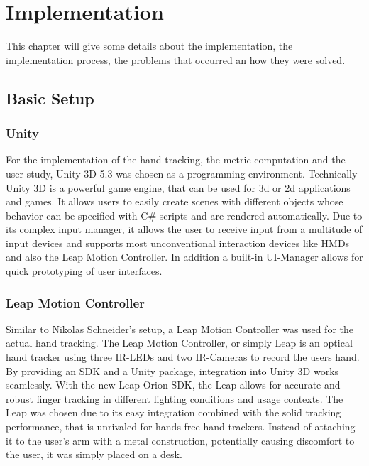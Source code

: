 \chapter{Implementation}\label{chapter:implementation}

This chapter will give some details about the implementation, the implementation process, the problems that occurred an how they were solved.

\section{Basic Setup}

\subsection{Unity}

For the implementation of the hand tracking, the metric computation and the user study, Unity 3D 5.3 was chosen as a programming environment. Technically Unity 3D is a powerful game engine, that can be used for 3d or 2d applications and games. It allows users to easily create scenes with different objects whose behavior can be specified with \textsc{C\#} scripts and are rendered automatically. Due to its complex input manager, it allows the user to receive input from a multitude of input devices and supports most unconventional interaction devices like HMDs and also the Leap Motion Controller. In addition a built-in UI-Manager allows for quick prototyping of user interfaces. 

\subsection{Leap Motion Controller}

Similar to Nikolas Schneider's setup, a Leap Motion Controller was used for the actual hand tracking. The Leap Motion Controller, or simply Leap is an optical hand tracker using three IR-LEDs and two IR-Cameras to record the users hand. By providing an SDK and a Unity package, integration into Unity 3D works seamlessly. With the new Leap Orion SDK, the Leap allows for accurate and robust finger tracking in different lighting conditions and usage contexts. The Leap was chosen due to its easy integration combined with the solid tracking performance, that is unrivaled for hands-free hand trackers.  
Instead of attaching it to the user's arm with a metal construction, potentially causing discomfort to the user, it was simply placed on a desk. 

